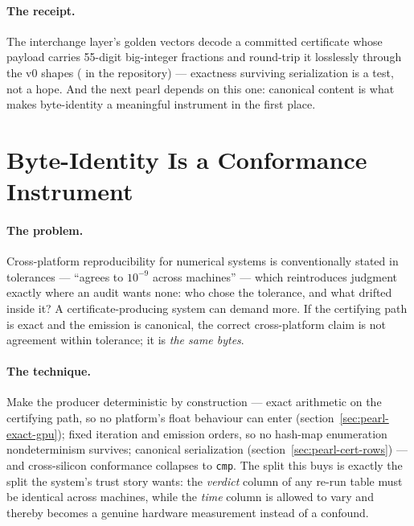 \paragraph{The receipt.} The interchange layer's golden vectors decode
a committed certificate whose payload carries 55-digit big-integer
fractions and round-trip it losslessly through the v0 shapes
( in the  repository)
--- exactness surviving serialization is a test, not a hope. And the
next pearl depends on this one: canonical content is what makes
byte-identity a meaningful instrument in the first place.

\section{Byte-Identity Is a Conformance Instrument}
\label{sec:pearl-byte-identity}

\paragraph{The problem.} Cross-platform reproducibility for numerical
systems is conventionally stated in tolerances --- ``agrees to
$10^{-9}$ across machines'' --- which reintroduces judgment exactly
where an audit wants none: who chose the tolerance, and what drifted
inside it? A certificate-producing system can demand more. If the
certifying path is exact and the emission is canonical, the correct
cross-platform claim is not agreement within tolerance; it is
\emph{the same bytes}.

\paragraph{The technique.} Make the producer deterministic by
construction --- exact arithmetic on the certifying path, so no
platform's float behaviour can enter
(section~\ref{sec:pearl-exact-gpu}); fixed iteration and emission
orders, so no hash-map enumeration nondeterminism survives; canonical
serialization (section~\ref{sec:pearl-cert-rows}) --- and
cross-silicon conformance collapses to \texttt{cmp}. The split this
buys is exactly the split the system's trust story wants: the
\emph{verdict} column of any re-run table must be identical across
machines, while the \emph{time} column is allowed to vary and thereby
becomes a genuine hardware measurement instead of a confound.

